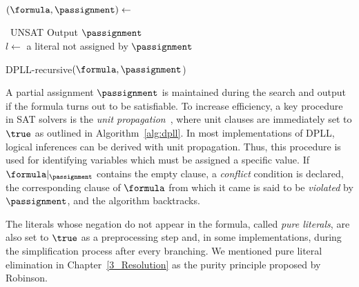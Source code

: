 \begin{algorithm}[htp]%
    \SetAlgoLined\DontPrintSemicolon%
    $(\formula, \passignment) \leftarrow$ \proc{$\formula,\passignment$}

    {\Return~UNSAT}
    {Output $\passignment$\\
    }
    $l \leftarrow$ a literal not assigned by $\passignment$

    {}

    \vspace{2mm}
    \setcounter{AlgoLine}{0}
    \caption{DPLL-recursive$(\formula, \passignment$)}%
    \label{alg:dpll}
\end{algorithm} 

A partial assignment $\passignment$ is maintained during the search and output if the
formula turns out to be satisfiable.  To increase efficiency, a key procedure in SAT
solvers is the \emph{unit propagation}~\cite{cdclchapter}, where unit clauses
are immediately set to $\true$ as outlined in Algorithm~\ref{alg:dpll}. In most
implementations of DPLL, logical inferences can be derived with unit propagation.
Thus, this procedure is used for identifying variables which must be assigned
a specific value. If $\formula |_\passignment$ contains the empty clause, a
\emph{conflict} condition is declared, the corresponding clause of $\formula$
from which it came is said to be \emph{violated} by $\passignment$, and the algorithm
backtracks. 

The literals whose negation do not appear in the formula, called
\emph{pure literals}, are also set to $\true$ as a preprocessing step and, in
some implementations, during the simplification process after every branching. 
We mentioned pure literal elimination in Chapter~\ref{3_Resolution} as the
purity principle proposed by Robinson.

